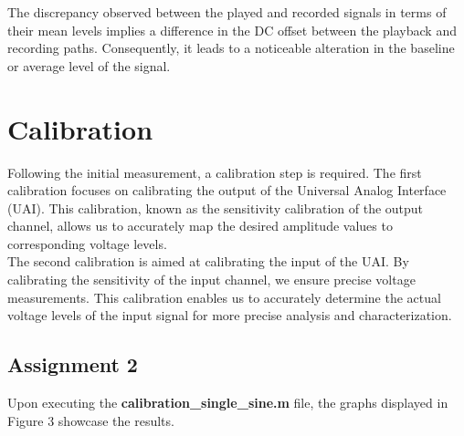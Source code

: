 \documentclass[
	a4paper,
	11pt,
]{article}
\begin{document}
The discrepancy observed between the played and recorded signals in terms of their mean levels implies a difference in the DC offset between the playback and recording paths. Consequently, it leads to a noticeable alteration in the baseline or average level of the signal.

\section{Calibration}
Following the initial measurement, a calibration step is required. The first calibration focuses on calibrating the output of the Universal Analog Interface (UAI). This calibration, known as the sensitivity calibration of the output channel, allows us to accurately map the desired amplitude values to corresponding voltage levels. \\
The second calibration is aimed at calibrating the input of the UAI. By calibrating the sensitivity of the input channel, we ensure precise voltage measurements. This calibration enables us to accurately determine the actual voltage levels of the input signal for more precise analysis and characterization.\\

\subsection{Assignment 2}
Upon executing the \textbf{calibration\_single\_sine.m} file, the graphs displayed in Figure 3 showcase the results.\\
\end{document}
